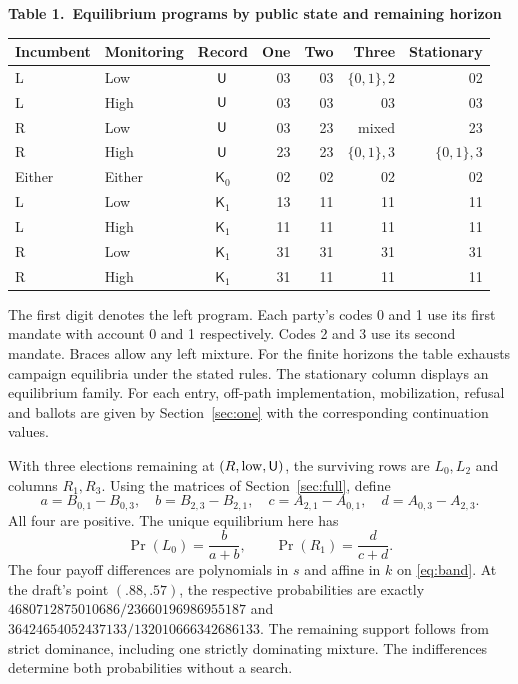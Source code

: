 \documentclass[11pt,letterpaper]{article}
\newcommand{\Krec}{\mathsf K}
\begin{document}
\begin{center}\small
\textbf{Table 1.\ Equilibrium programs by public state and remaining horizon}\\[4pt]
\begin{tabular}{@{}llcrrrr@{}}\toprule
Incumbent & Monitoring & Record & One & Two & Three & Stationary\\\midrule
L&Low &\(\mathsf U\)&03&03&\(\{0,1\},2\)&02\\
L&High&\(\mathsf U\)&03&03&03&03\\
R&Low &\(\mathsf U\)&03&23&mixed&23\\
R&High&\(\mathsf U\)&23&23&\(\{0,1\},3\)&\(\{0,1\},3\)\\[2pt]
Either&Either&\(\Krec_0\)&02&02&02&02\\[2pt]
L&Low &\(\Krec_1\)&13&11&11&11\\
L&High&\(\Krec_1\)&11&11&11&11\\
R&Low &\(\Krec_1\)&31&31&31&31\\
R&High&\(\Krec_1\)&31&11&11&11\\\bottomrule
\end{tabular}
\end{center}
The first digit denotes the left program. Each party's codes 0 and 1 use its first mandate with account 0 and 1 respectively. Codes 2 and 3 use its second mandate. Braces allow any left mixture. For the finite horizons the table exhausts campaign equilibria under the stated rules. The stationary column displays an equilibrium family. For each entry, off-path implementation, mobilization, refusal and ballots are given by Section~\ref{sec:one} with the corresponding continuation values.

With three elections remaining at \((R,\mathrm{low},\mathsf U)\), the surviving rows are \(L_0,L_2\) and columns \(R_1,R_3\). Using the matrices of Section~\ref{sec:full}, define
\[
 a=B_{0,1}-B_{0,3},\quad b=B_{2,3}-B_{2,1},\quad
 c=A_{2,1}-A_{0,1},\quad d=A_{0,3}-A_{2,3}.
\]
All four are positive. The unique equilibrium here has
\begin{equation}
 \Pr(L_0)=\frac{b}{a+b},\qquad \Pr(R_1)=\frac{d}{c+d}.\label{eq:mix}
\end{equation}
The four payoff differences are polynomials in \(s\) and affine in \(k\) on \eqref{eq:band}. At the draft's point \((.88,.57)\), the respective probabilities are exactly \(4680712875010686/23660196986955187\) and \(36424654052437133/132010666342686133\). The remaining support follows from strict dominance, including one strictly dominating mixture. The indifferences determine both probabilities without a search.
\end{document}
